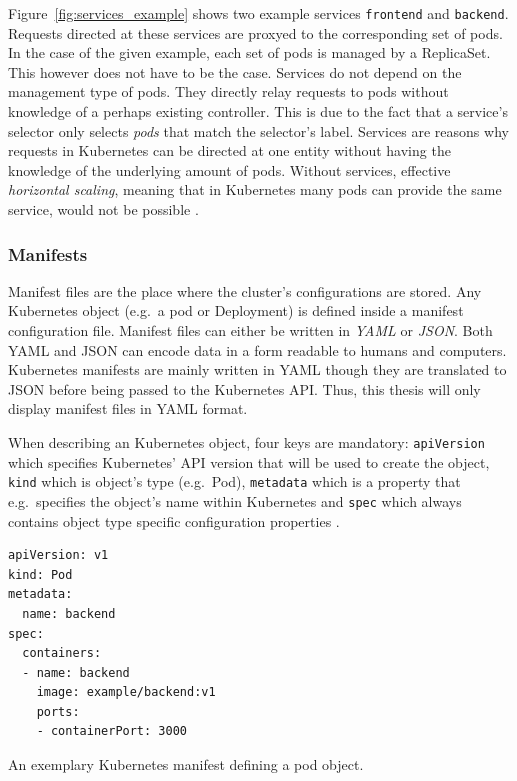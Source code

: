 Figure~\ref{fig:services_example} shows two example services \texttt{frontend}
and \texttt{backend}. Requests directed at these services are proxyed to the
corresponding set of pods. In the case of the given example, each set of pods
is managed by a ReplicaSet. This however does not have to be the case. Services
do not depend on the management type of pods. They directly relay requests to
pods without knowledge of a perhaps existing controller. This is due to the
fact that a service's selector only selects \textit{pods} that match the
selector's label. Services are reasons why requests in Kubernetes can be
directed at one entity without having the knowledge of the underlying amount of
pods. Without services, effective \textit{horizontal scaling}, meaning that in
Kubernetes many pods can provide the same service, would not be possible
\autocite[Ch. 5]{LuksaKubernetesAction2017}.

\subsubsection{Manifests}%
\label{ssub:Manifests}
Manifest files are the place where the cluster's configurations are stored. Any
Kubernetes object (e.g.\ a pod or Deployment) is defined inside a manifest
configuration file. Manifest files can either be written in \textit{YAML} or
\textit{JSON}. Both YAML and JSON can encode data in a form readable to humans
and computers. Kubernetes manifests are mainly written in YAML though they are
translated to JSON before being passed to the Kubernetes \ac{API}. Thus, this
thesis will only display manifest files in YAML format.

When describing an Kubernetes object, four keys are mandatory:
\texttt{apiVersion} which specifies Kubernetes' \ac{API} version that will be
used to create the object, \texttt{kind} which is object's type (e.g.\ Pod),
\texttt{metadata} which is a property that e.g.\ specifies the object's name
within Kubernetes and \texttt{spec} which always contains object type specific
configuration properties \autocite{AuthorsUnderstandingKubernetesObjects2019}.

\begin{listing}[H]
  \begin{verbatim}
apiVersion: v1
kind: Pod
metadata:
  name: backend
spec:
  containers:
  - name: backend
    image: example/backend:v1
    ports:
    - containerPort: 3000
  \end{verbatim}
  \caption{An exemplary Kubernetes manifest defining a pod object.}%
  \label{listing:manifest_example}
\end{listing}

